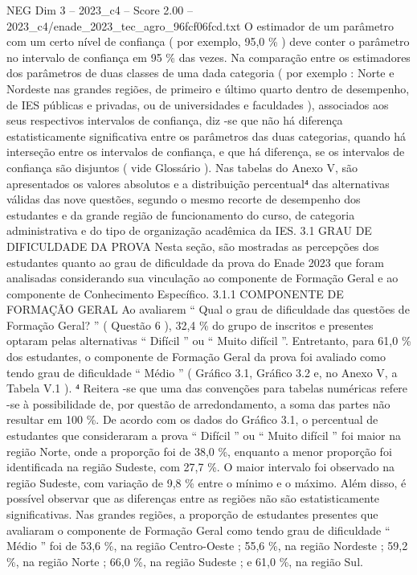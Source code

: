 \begin{textsample}{NEG Dim 3 – 2023\_c4 – Score 2.00 – 2023\_c4/enade\_2023\_tec\_agro\_96fcf06fcd.txt}
O estimador de um parâmetro com um certo nível de confiança ( por exemplo, 95,0 \% ) deve conter o parâmetro no intervalo de confiança em 95 \% das vezes.
Na comparação entre os estimadores dos parâmetros de duas classes de uma dada categoria ( por exemplo : Norte e Nordeste nas grandes regiões, de primeiro e último quarto dentro de desempenho, de IES públicas e privadas, ou de universidades e faculdades ), associados aos seus respectivos intervalos de confiança, diz -se que não há diferença estatisticamente significativa entre os parâmetros das duas categorias, quando há interseção entre os intervalos de confiança, e que há diferença, se os intervalos de confiança são disjuntos ( vide Glossário ).
Nas tabelas do Anexo V, são apresentados os valores absolutos e a distribuição percentual⁴ das alternativas válidas das nove questões, segundo o mesmo recorte de desempenho dos estudantes e da grande região de funcionamento do curso, de categoria administrativa e do tipo de organização acadêmica da IES. 3.1 GRAU DE DIFICULDADE DA PROVA Nesta seção, são mostradas as percepções dos estudantes quanto ao grau de dificuldade da prova do Enade 2023 que foram analisadas considerando sua vinculação ao componente de Formação Geral e ao componente de Conhecimento Específico. 3.1.1 COMPONENTE DE FORMAÇÃO GERAL Ao avaliarem “ Qual o grau de dificuldade das questões de Formação Geral? ” ( Questão 6 ), 32,4 \% do grupo de inscritos e presentes optaram pelas alternativas “ Difícil ” ou “ Muito difícil ”.
Entretanto, para 61,0 \% dos estudantes, o componente de Formação Geral da prova foi avaliado como tendo grau de dificuldade “ Médio ” ( Gráfico 3.1, Gráfico 3.2 e, no Anexo V, a Tabela V.1 ). ⁴ Reitera -se que uma das convenções para tabelas numéricas refere -se à possibilidade de, por questão de arredondamento, a soma das partes não resultar em 100 \%.
De acordo com os dados do Gráfico 3.1, o percentual de estudantes que consideraram a prova “ Difícil ” ou “ Muito difícil ” foi maior na região Norte, onde a proporção foi de 38,0 \%, enquanto a menor proporção foi identificada na região Sudeste, com 27,7 \%.
O maior intervalo foi observado na região Sudeste, com variação de 9,8 \% entre o mínimo e o máximo.
Além disso, é possível observar que as diferenças entre as regiões não são estatisticamente significativas.
Nas grandes regiões, a proporção de estudantes presentes que avaliaram o componente de Formação Geral como tendo grau de dificuldade “ Médio ” foi de 53,6 \%, na região Centro-Oeste ; 55,6 \%, na região Nordeste ; 59,2 \%, na região Norte ; 66,0 \%, na região Sudeste ; e 61,0 \%, na região Sul.

\end{textsample}
